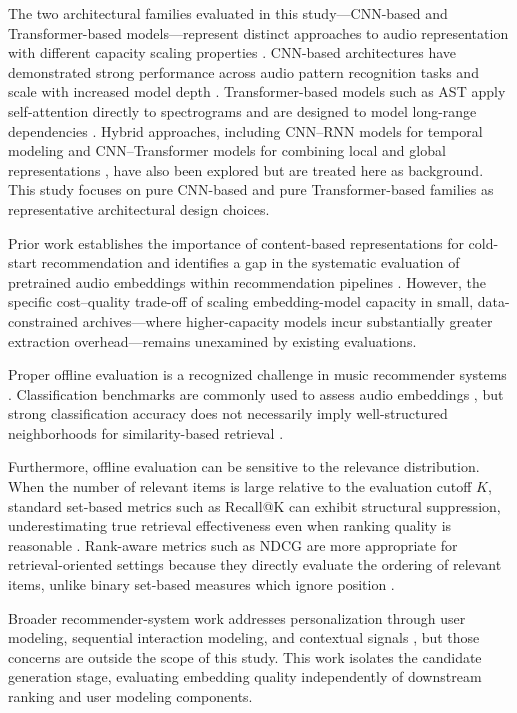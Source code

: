 \documentclass[sigconf]{acmart}
\begin{document}
The two architectural families evaluated in this study---CNN-based and Transformer-based models---represent distinct approaches to audio representation with different capacity scaling properties \cite{zaman2023}. CNN-based architectures have demonstrated strong performance across audio pattern recognition tasks and scale with increased model depth \cite{kong2020panns}. Transformer-based models such as AST apply self-attention directly to spectrograms and are designed to model long-range dependencies \cite{gong2021ast, zaman2023}. Hybrid approaches, including CNN--RNN models for temporal modeling \cite{lin2024} and CNN--Transformer models for combining local and global representations \cite{pourmoazemi2024}, have also been explored but are treated here as background. This study focuses on pure CNN-based and pure Transformer-based families as representative architectural design choices.

Prior work establishes the importance of content-based representations for cold-start recommendation \cite{schedl2018, deldjoo2024} and identifies a gap in the systematic evaluation of pretrained audio embeddings within recommendation pipelines \cite{tamm2024}. However, the specific cost--quality trade-off of scaling embedding-model capacity in small, data-constrained archives---where higher-capacity models incur substantially greater extraction overhead---remains unexamined by existing evaluations.

Proper offline evaluation is a recognized challenge in music recommender systems \cite{schedl2018}. Classification benchmarks are commonly used to assess audio embeddings \cite{gong2021ast, zaman2023}, but strong classification accuracy does not necessarily imply well-structured neighborhoods for similarity-based retrieval \cite{tamm2024}.

Furthermore, offline evaluation can be sensitive to the relevance distribution. When the number of relevant items is large relative to the evaluation cutoff $K$, standard set-based metrics such as Recall@K can exhibit structural suppression, underestimating true retrieval effectiveness even when ranking quality is reasonable \cite{canamares2020}. Rank-aware metrics such as NDCG are more appropriate for retrieval-oriented settings because they directly evaluate the ordering of relevant items, unlike binary set-based measures which ignore position \cite{urbano2013}.

Broader recommender-system work addresses personalization through user modeling, sequential interaction modeling, and contextual signals \cite{lin2025, abbattista2024, schedl2021}, but those concerns are outside the scope of this study. This work isolates the candidate generation stage, evaluating embedding quality independently of downstream ranking and user modeling components.
\end{document}
